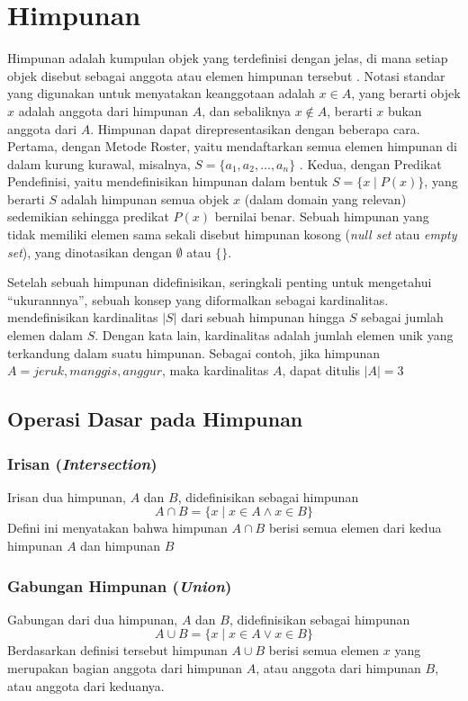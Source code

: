\documentclass[a4paper,12pt]{report}
\numberwithin{equation}{chapter}
\begin{document}
\section{Himpunan}
Himpunan adalah kumpulan objek yang terdefinisi dengan jelas, di mana setiap objek disebut sebagai anggota atau elemen himpunan tersebut \citep{Kenneth2000Handbook}. Notasi standar yang digunakan untuk menyatakan keanggotaan adalah $x \in A$, yang berarti objek $x$ adalah anggota dari himpunan $A$, dan sebaliknya $x \notin A$, berarti $x$ bukan anggota dari $A$. Himpunan dapat direpresentasikan dengan beberapa cara. Pertama, dengan Metode Roster, yaitu mendaftarkan semua elemen himpunan di dalam kurung kurawal, misalnya, $S = \{a_1, a_2, \ldots, a_n\}$
. Kedua, dengan Predikat Pendefinisi, yaitu mendefinisikan himpunan dalam bentuk $S = \{ x \mid P(x) \}$, yang berarti $S$ adalah himpunan semua objek $x$ (dalam domain yang relevan) sedemikian sehingga predikat $P(x)$ bernilai benar. Sebuah himpunan yang tidak memiliki elemen sama sekali disebut himpunan kosong (\textit{null set} atau \textit{empty set}), yang dinotasikan dengan $\emptyset$ atau $\{\}$.

Setelah sebuah himpunan didefinisikan, seringkali penting untuk mengetahui ``ukurannnya'', sebuah konsep  yang diformalkan sebagai kardinalitas. \cite{Kenneth2000Handbook} mendefinisikan kardinalitas $|S|$ dari sebuah himpunan hingga $S$ sebagai jumlah elemen dalam $S$. Dengan kata lain, kardinalitas adalah  jumlah elemen unik yang terkandung dalam suatu himpunan. Sebagai contoh, jika himpunan $A = {jeruk, manggis,anggur}$, maka kardinalitas $A$, dapat ditulis $|A|=3$

\subsection{Operasi Dasar pada Himpunan}
\subsubsection{Irisan (\textit{Intersection})} Irisan dua himpunan, $A$ dan $B$, didefinisikan sebagai himpunan  
\[
  A \cap B = \{ x \mid x \in A \land x \in B \}
\]
Defini ini menyatakan bahwa himpunan $A \cap B$ berisi semua elemen dari kedua himpunan $A$ dan himpunan $B$
\subsubsection{Gabungan Himpunan (\textit{Union})}
Gabungan dari dua himpunan, $A$ dan $B$, didefinisikan sebagai himpunan   
\[
  A \cup B = \{ x \mid x \in A \lor x \in B \}
\]
Berdasarkan definisi tersebut himpunan $A \cup B$ berisi semua elemen $x$ yang merupakan bagian anggota dari himpunan $A$, atau anggota dari himpunan $B$, atau anggota dari keduanya.
\end{document}
